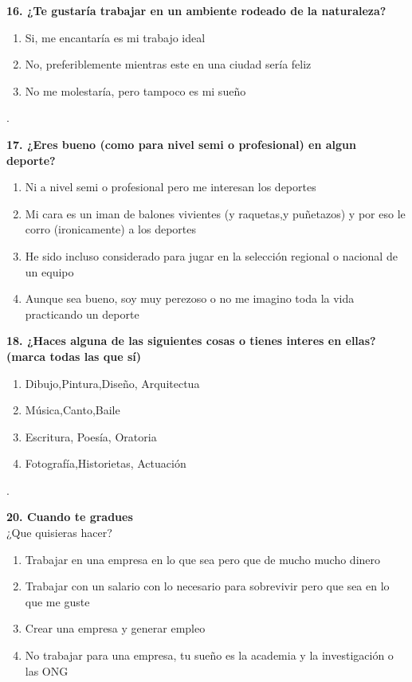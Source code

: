 \documentclass{article}
\begin{document}
\textbf{16. ¿Te gustaría trabajar en un ambiente rodeado de la naturaleza?}
\begin{enumerate}[label=(\Alph*)]
\item Si, me encantaría es mi trabajo ideal
\item No, preferiblemente mientras este en una ciudad sería feliz
\item No me molestaría, pero tampoco es mi sueño
 \end{enumerate}. 


\textbf{17. ¿Eres bueno (como para nivel semi o profesional) en algun deporte?}
\begin{enumerate}[label=(\Alph*)]
\item Ni a nivel semi o profesional pero me interesan los deportes
\item Mi cara es un iman de balones vivientes (y raquetas,y puñetazos) y por eso le corro (ironicamente) a los deportes
\item He sido incluso considerado para jugar en la selección regional o nacional de un equipo
\item Aunque sea bueno, soy muy perezoso o no me imagino toda la vida practicando un deporte
\end{enumerate} 

\textbf{18. ¿Haces alguna de las siguientes cosas o tienes interes en ellas? (marca todas las que sí) } 
\begin{enumerate}[label=(\Alph*)]
\item Dibujo,Pintura,Diseño, Arquitectua
\item Música,Canto,Baile
\item Escritura, Poesía, Oratoria
\item Fotografía,Historietas, Actuación
\end{enumerate}.

\textbf{20. Cuando te gradues }\\
¿Que quisieras hacer?
\begin{enumerate}[label=(\Alph*)]
\item Trabajar en una empresa en lo que sea pero que de mucho mucho dinero
\item Trabajar con un salario con lo necesario para sobrevivir pero que sea en lo que me guste
\item Crear una empresa y generar empleo
\item No trabajar para una empresa, tu sueño es la academia y la investigación o las ONG 
 \end{enumerate}  
\end{document}
